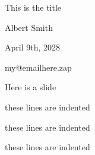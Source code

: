 \documentclass[11pt]{article}
\def\vsp {\vspace*{0.5cm}}
\begin{document}
\large




\vspace*{1.0cm}
\centerline{\LARGE This is the title}
\vspace{1.5cm}

\centerline{\Large Albert Smith}

\vspace{0.5cm}

\centerline{April 9th, 2028}

\vsp
\centerline{my@emailhere.zap}

\newpage %

\Large

\vsp
\noindent
Here is a slide

these lines are indented

these lines are indented

these lines are indented

\newpage %

\end{document}
